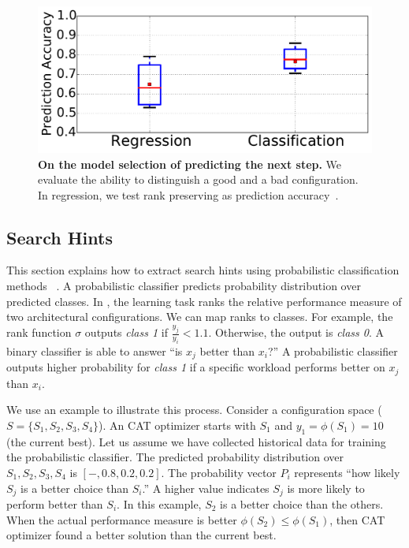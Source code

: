 \begin{figure}[t]
 \includegraphics[width=.8\textwidth]{figures/multiple_prediction_accuracy.pdf}
 \centering
 \caption{\textbf{On the model selection of predicting the next step.}
 We evaluate the ability to distinguish a good and a bad configuration.
 In regression, we test rank preserving as prediction accuracy~\cite{nair2017}.}
 \label{fig:reg_clas}
\end{figure}


\subsection{Search Hints}
This section explains how to extract search hints using
probabilistic classification methods
~\cite{friedman2001elements,zadrozny2001obtaining,zadrozny2002transforming}.
A probabilistic classifier predicts probability distribution over
predicted classes.
In \myequation{\ref{eq:3}}, the learning task ranks the relative
performance measure of two architectural configurations.
We can map ranks to classes.
For example, the rank function $\sigma$ outputs \emph{class 1} if
$\frac{y_j}{y_i} < 1.1$. Otherwise, the output is \emph{class 0}.
A binary classifier is able to answer ``is $x_j$ better than $x_i$?''
A probabilistic classifier outputs higher probability for \emph{class 1} if
a specific workload performs better on $x_j$ than $x_i$.

We use an example to illustrate this process.
Consider a configuration space ($S=\{S_1, S_2, S_3, S_4\}$).
An CAT optimizer starts with $S_1$ and $y_1 = \phi(S_1) = 10$ (the current best).
Let us assume we have collected historical data for
training the probabilistic classifier.
The predicted probability distribution over ${S_1, S_2, S_3, S_4}$ 
is $[-, 0.8, 0.2, 0.2]$.
The probability vector $P_{i}$ represents
``how likely $S_j$ is a better choice than $S_i$.''
A higher value indicates $S_j$ is more likely
to perform better than $S_i$. 
In this example, $S_2$ is a better choice than the others.
When the actual performance measure is better $\phi(S_2) \leq \phi(S_1)$,
then CAT optimizer found a better solution than the current best.

